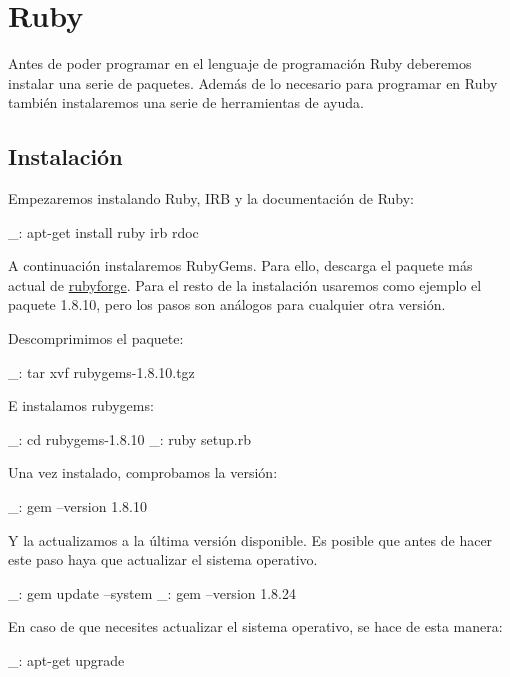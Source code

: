 \chapter{Ruby}
\label{comun:ruby}

Antes de poder programar en el lenguaje de programación Ruby deberemos instalar una serie de paquetes. Además de lo necesario para programar en Ruby también instalaremos una serie de herramientas de ayuda.


\section{Instalación}

Empezaremos instalando Ruby, IRB y la documentación de Ruby:

\begin{bashcode}
_: apt-get install ruby irb rdoc
\end{bashcode}

A continuación instalaremos RubyGems. Para ello, descarga el paquete más actual de \href{http://rubyforge.org/frs/?group_id=126}{rubyforge}. Para el resto de la instalación usaremos como ejemplo el paquete 1.8.10, pero los pasos son análogos para cualquier otra versión.

Descomprimimos el paquete:

\begin{bashcode}
_: tar xvf rubygems-1.8.10.tgz
\end{bashcode}

E instalamos rubygems:

\begin{bashcode}
_: cd rubygems-1.8.10
_: ruby setup.rb
\end{bashcode}

Una vez instalado, comprobamos la versión:

\begin{bashcode}
_: gem --version
1.8.10
\end{bashcode}

Y la actualizamos a la última versión disponible. Es posible que antes de hacer este paso haya que actualizar el sistema operativo.

\begin{bashcode}
_: gem update --system
_: gem --version
1.8.24
\end{bashcode}

En caso de que necesites actualizar el sistema operativo, se hace de esta manera:

\begin{bashcode}
_: apt-get upgrade
\end{bashcode}


